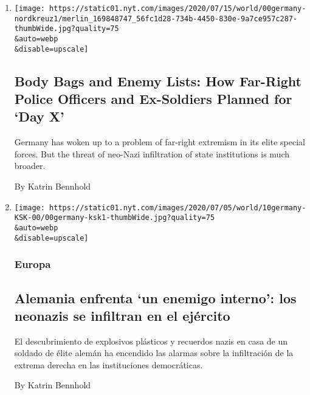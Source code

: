 \begin{enumerate}
\def\labelenumi{\arabic{enumi}.}
\item
  \href{/2020/08/01/world/europe/germany-nazi-infiltration.html}{}

  \texttt{[image: https://static01.nyt.com/images/2020/07/15/world/00germany-nordkreuz1/merlin\_169848747\_56fc1d28-734b-4450-830e-9a7ce957c287-thumbWide.jpg?quality=75\\\&auto=webp\\\&disable=upscale]}

  \hypertarget{body-bags-and-enemy-lists-how-far-right-police-officers-and-ex-soldiers-planned-for-day-x}{%
  \subsection{Body Bags and Enemy Lists: How Far-Right Police Officers
  and Ex-Soldiers Planned for `Day
  X'}\label{body-bags-and-enemy-lists-how-far-right-police-officers-and-ex-soldiers-planned-for-day-x}}

  Germany has woken up to a problem of far-right extremism in its elite
  special forces. But the threat of neo-Nazi infiltration of state
  institutions is much broader.

  By Katrin Bennhold
\item
  \href{/es/2020/07/10/espanol/mundo/alemania-ksk-neonazi.html}{}

  \texttt{[image: https://static01.nyt.com/images/2020/07/05/world/10germany-KSK-00/00germany-ksk1-thumbWide.jpg?quality=75\\\&auto=webp\\\&disable=upscale]}

  \hypertarget{europa}{%
  \subsubsection{Europa}\label{europa}}

  \hypertarget{alemania-enfrenta-un-enemigo-interno-los-neonazis-se-infiltran-en-el-ejuxe9rcito}{%
  \subsection{Alemania enfrenta `un enemigo interno': los neonazis se
  infiltran en el
  ejército}\label{alemania-enfrenta-un-enemigo-interno-los-neonazis-se-infiltran-en-el-ejuxe9rcito}}

  El descubrimiento de explosivos plásticos y recuerdos nazis en casa de
  un soldado de élite alemán ha encendido las alarmas sobre la
  infiltración de la extrema derecha en las instituciones democráticas.

  By Katrin Bennhold


\end{enumerate}
